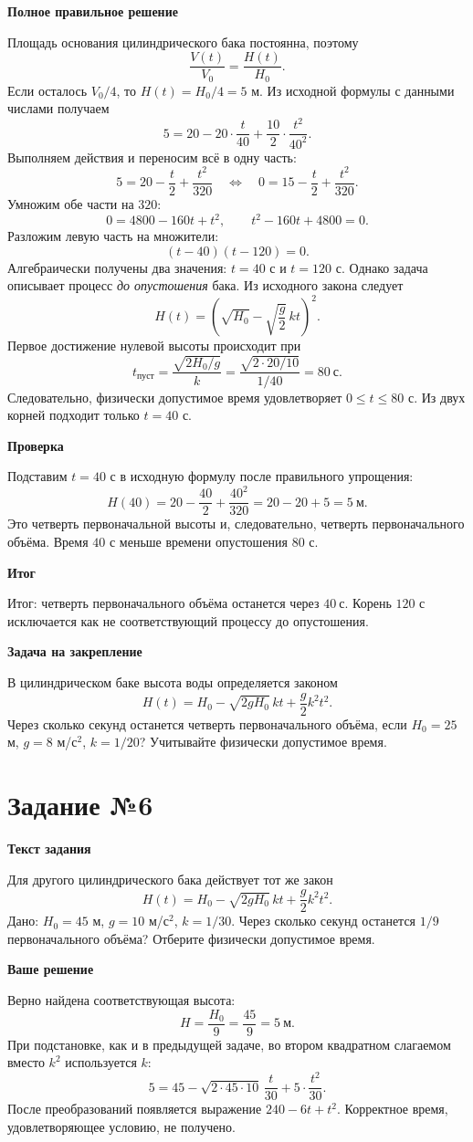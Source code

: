\documentclass[12pt,a4paper]{article}
\newcommand{\taskheading}[1]{\phantomsection\label{task:#1}\section*{Задание №#1}}
\newcommand{\reviewline}[1]{\par\medskip\textbf{#1}\par\smallskip}
\begin{document}
\reviewline{Полное правильное решение}
Площадь основания цилиндрического бака постоянна, поэтому
\[
\frac{V(t)}{V_0}=\frac{H(t)}{H_0}.
\]
Если осталось $V_0/4$, то $H(t)=H_0/4=5$ м. Из исходной формулы с данными числами получаем
\[
5=20-20\cdot\frac{t}{40}
     +\frac{10}{2}\cdot\frac{t^2}{40^2}.
\]
Выполняем действия и переносим всё в одну часть:
\[
5=20-\frac{t}{2}+\frac{t^2}{320}
\quad\Longleftrightarrow\quad
0=15-\frac{t}{2}+\frac{t^2}{320}.
\]
Умножим обе части на $320$:
\[
0=4800-160t+t^2,
\qquad t^2-160t+4800=0.
\]
Разложим левую часть на множители:
\[
(t-40)(t-120)=0.
\]
Алгебраически получены два значения: $t=40$ с и $t=120$ с. Однако задача описывает процесс \emph{до опустошения} бака. Из исходного закона следует
\[
H(t)=\left(\sqrt{H_0}-\sqrt{\frac g2}\,kt\right)^2.
\]
Первое достижение нулевой высоты происходит при
\[
t_{\text{пуст}}=\frac{\sqrt{2H_0/g}}{k}
=\frac{\sqrt{2\cdot20/10}}{1/40}
=80\ \text{с}.
\]
Следовательно, физически допустимое время удовлетворяет $0\le t\le80$ с. Из двух корней подходит только $t=40$ с.

\reviewline{Проверка}
Подставим $t=40$ с в исходную формулу после правильного упрощения:
\[
H(40)=20-\frac{40}{2}+\frac{40^2}{320}
=20-20+5=5\ \text{м}.
\]
Это четверть первоначальной высоты и, следовательно, четверть первоначального объёма. Время $40$ с меньше времени опустошения $80$ с.

\reviewline{Итог}
\textcolor{teal!60!black}{Итог:} четверть первоначального объёма останется через $\boxed{40\ \text{с}}$. Корень $120$ с исключается как не соответствующий процессу до опустошения.

\reviewline{Задача на закрепление}
В цилиндрическом баке высота воды определяется законом
\[
H(t)=H_0-\sqrt{2gH_0}\,kt+\frac{g}{2}k^2t^2.
\]
Через сколько секунд останется четверть первоначального объёма, если $H_0=25$ м, $g=8$ м/с$^2$, $k=1/20$? Учитывайте физически допустимое время.

\newpage
\taskheading{6}
\reviewline{Текст задания}
Для другого цилиндрического бака действует тот же закон
\[
H(t)=H_0-\sqrt{2gH_0}\,kt+\frac{g}{2}k^2t^2.
\]
Дано: $H_0=45$ м, $g=10$ м/с$^2$, $k=1/30$. Через сколько секунд останется $1/9$ первоначального объёма? Отберите физически допустимое время.

\reviewline{Ваше решение}
Верно найдена соответствующая высота:
\[
H=\frac{H_0}{9}=\frac{45}{9}=5\ \text{м}.
\]
При подстановке, как и в предыдущей задаче, во втором квадратном слагаемом вместо $k^2$ используется $k$:
\[
5=45-\sqrt{2\cdot45\cdot10}\,\frac t{30}
 +5\cdot\frac{t^2}{30}.
\]
После преобразований появляется выражение $240-6t+t^2$. Корректное время, удовлетворяющее условию, не получено.
\end{document}
